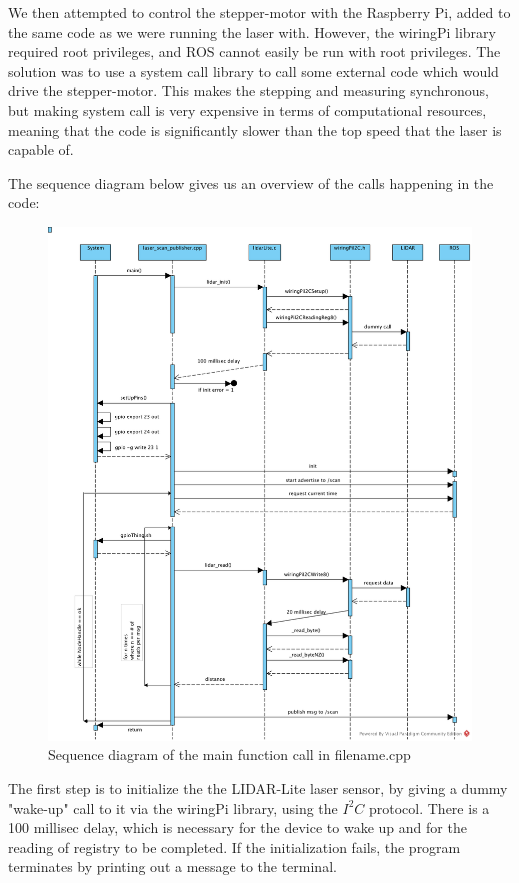 We then attempted to control the stepper-motor with the Raspberry Pi, added to the same code as we were running the laser with. However, the wiringPi library required root privileges, and ROS cannot easily be run with root privileges. The solution was to use a system call library to call some external code which would drive the stepper-motor. This makes the stepping and measuring synchronous, but making system call is very expensive in terms of computational resources, meaning that the code is significantly slower than the top speed that the laser is capable of.


\clearpage
The sequence diagram below gives us an overview of the calls happening in the code:

\begin{figure}[H]
	\centering
	\includegraphics[scale=.6]{images/laser-module.png}
	\caption{Sequence diagram of the main function call in filename.cpp}
	\label{fig:lasermodule}
\end{figure}

The first step is to initialize the the LIDAR-Lite laser sensor, by giving a dummy "wake-up" call to it via the wiringPi library, using the $I^2C$ protocol. There is a 100 millisec delay, which is necessary for the device to wake up and for the reading of registry to be completed. If the initialization fails, the program terminates by printing out a message to the terminal.

